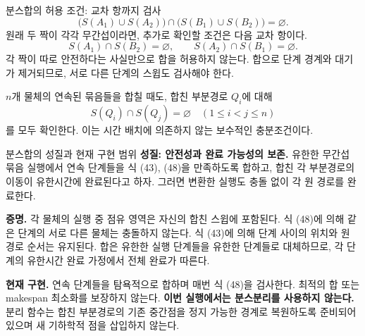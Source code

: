 \begin{frame}{분스합의 허용 조건: 교차 항까지 검사}
\small
\begin{equation}
 \boxed{\bigl(S(A_1)\cup S(A_2)\bigr)
 \cap\bigl(S(B_1)\cup S(B_2)\bigr)=\varnothing.}
 \tag{46}\label{eq:safe-pair-merge}
\end{equation}
원래 두 짝이 각각 무간섭이라면, 추가로 확인할 조건은 다음 교차 항이다.
\begin{equation}
 S(A_1)\cap S(B_2)=\varnothing,\qquad
 S(A_2)\cap S(B_1)=\varnothing.
 \tag{47}\label{eq:merge-cross-terms}
\end{equation}
각 짝이 따로 안전하다는 사실만으로 합을 허용하지 않는다.
합으로 단계 경계와 대기가 제거되므로, 서로 다른 단계의 스윕도 검사해야 한다.
\medskip

$n$개 물체의 연속된 묶음들을 합칠 때도, 합친 부분경로 $Q_i$에 대해
\begin{equation}
 S(Q_i)\cap S(Q_j)=\varnothing\quad(1\le i<j\le n)
 \tag{48}\label{eq:safe-tuple-merge}
\end{equation}
를 모두 확인한다. 이는 시간 배치에 의존하지 않는 보수적인 충분조건이다.
\end{frame}

\begin{frame}{분스합의 성질과 현재 구현 범위}
\small
\textbf{성질: 안전성과 완료 가능성의 보존.}
유한한 무간섭 묶음 실행에서 연속 단계들을 식 (43), (48)을 만족하도록
합하고, 합친 각 부분경로의 이동이 유한시간에 완료된다고 하자.
그러면 변환한 실행도 충돌 없이 각 원 경로를 완료한다.
\medskip

\textbf{증명.} 각 물체의 실행 중 점유 영역은 자신의 합친 스윕에 포함된다.
식 (48)에 의해 같은 단계의 서로 다른 물체는 충돌하지 않는다.
식 (43)에 의해 단계 사이의 위치와 원 경로 순서는 유지된다.
합은 유한한 실행 단계들을 유한한 단계들로 대체하므로,
각 단계의 유한시간 완료 가정에서 전체 완료가 따른다.
\medskip

\textbf{현재 구현.} 연속 단계들을 탐욕적으로 합하며 매번 식 (48)을 검사한다.
최적의 합 또는 makespan 최소화를 보장하지 않는다.
\textbf{이번 실행에서는 분스분리를 사용하지 않는다.}
분리 함수는 합친 부분경로의 기존 중간점을 정지 가능한 경계로 복원하도록
준비되어 있으며 새 기하학적 점을 삽입하지 않는다.
\end{frame}



